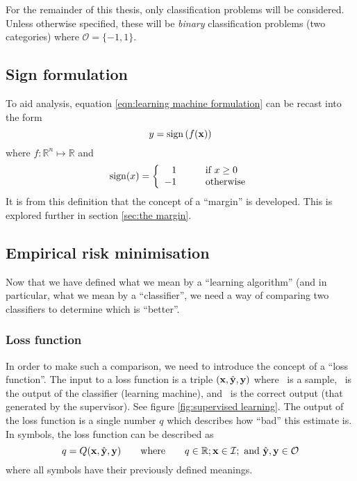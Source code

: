 For the remainder of this thesis, only classification problems will be
considered.  Unless otherwise specified, these will be \emph{binary}
classification problems (two categories) where $\mathcal{O} = \{-1,
1\}$.

\subsection{Sign formulation}
To aid analysis, equation \ref{eqn:learning machine formulation}
can be recast into the form
%
\begin{equation}
y = \mathrm{sign} \left( f(\mathbf{x}) \right)
\label{eqn:marginal classification formulation}
\end{equation}
%
where $f : \mathbb{R}^n \mapsto \mathbb{R}$ and
%
\begin{equation}
\mathrm{sign} (x) = \left\{ \begin{array}{rl}
1	& \qquad \mbox{if $x \geq 0$} \\
-1	& \qquad \mbox{otherwise}
\end{array} \right.
\end{equation}
%
It is from this definition that the concept of a ``margin'' is
developed.  This is explored further in section \ref{sec:the margin}.


\subsection{Empirical risk minimisation}
\label{sec:erm}

Now that we have defined what we mean by a ``learning algorithm'' (and
in particular, what we mean by a ``classifier'', we need a way of
comparing two classifiers to determine which is ``better''.


\subsubsection{Loss function}

In order to make such a comparison, we need to introduce the concept
of a ``loss function''.  The input to a loss function is a triple
$(\mathbf{x}, \hat{\mathbf{y}}, \mathbf{y})$ where \bfx\ is a sample, \bfyh\ is the
output of the classifier (learning machine), and \bfy\ is the correct output (that generated by the supervisor).  See figure \ref{fig:supervised
learning}.  The output of the loss function is a single number $q$
which describes how ``bad'' this estimate is.  In symbols, the loss
function can be described as
%
\begin{equation}
q = Q(\mathbf{x}, \hat{\mathbf{y}}, \mathbf{y}) \qquad \mbox{where} \qquad q \in \mathbb{R};
\mathbf{x} \in \mathcal{I}; \mbox{ and }\hat{\mathbf{y}}, \mathbf{y} \in \mathcal{O}
\end{equation}
%
where all symbols have their previously defined meanings.

